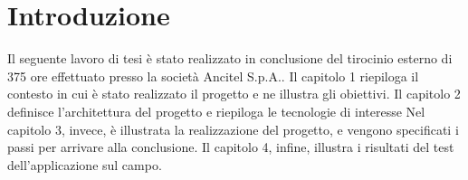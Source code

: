
\chapter*{Introduzione}
\label{ref:intro}  

Il seguente lavoro di tesi è stato realizzato in conclusione del tirocinio esterno di 375 ore effettuato presso la società Ancitel S.p.A..
Il capitolo 1 riepiloga il contesto in cui è stato realizzato il progetto e ne illustra gli obiettivi.
Il capitolo 2 definisce l'architettura del progetto e riepiloga le tecnologie di interesse
Nel capitolo 3, invece, è illustrata la realizzazione del progetto, e vengono specificati i passi per arrivare alla conclusione.
Il capitolo 4, infine, illustra i risultati del test dell'applicazione sul campo.

